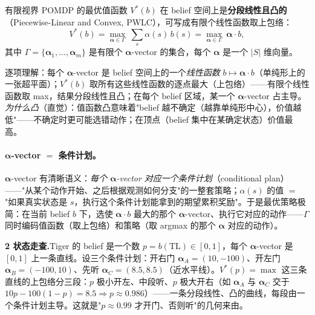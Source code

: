 \begin{theorem}\label{thm:pomdp-pwlc}
有限视界 POMDP 的最优值函数 $V^*(b)$ 在 belief 空间上是\textbf{分段线性且凸的}（Piecewise-Linear and Convex, PWLC），可写成有限个线性函数取上包络：
\begin{equation}
  V^*(b)=\max_{\boldsymbol{\alpha}\in\Gamma}\ \sum_{s}\alpha(s)\,b(s)=\max_{\boldsymbol{\alpha}\in\Gamma}\ \boldsymbol{\alpha}\cdot b,
  \label{eq:pomdp-alpha}
\end{equation}
其中 $\Gamma=\{\boldsymbol{\alpha}_1,\dots,\boldsymbol{\alpha}_m\}$ 是有限个 $\boldsymbol{\alpha}$-vector 的集合，每个 $\boldsymbol{\alpha}$ 是一个 $|S|$ 维向量。
\end{theorem}

逐项理解：每个 $\boldsymbol{\alpha}$-vector 是 belief 空间上的一个\emph{线性函数} $b\mapsto\boldsymbol{\alpha}\cdot b$（单纯形上的一张超平面）；$V^*(b)$ 取所有这些线性函数的逐点最大（上包络）——有限个线性函数取 max，结果分段线性且凸；在每个 belief 区域，某一个 $\boldsymbol{\alpha}$-vector 占主导。\emph{为什么凸}（直觉）：值函数凸意味着"belief 越不确定（越靠单纯形中心），价值越低"——不确定时更可能选错动作；在顶点（belief 集中在某确定状态）价值最高。

\paragraph{$\boldsymbol{\alpha}$-vector $=$ 条件计划。}
$\boldsymbol{\alpha}$-vector 有清晰语义：\emph{每个 $\boldsymbol{\alpha}$-vector 对应一个条件计划}（conditional plan）——"从某个动作开始、之后根据观测如何分支"的一整套策略；$\alpha(s)$ 的值 $=$ "如果真实状态是 $s$，执行这个条件计划能拿到的期望累积奖励"。于是最优策略极简：在当前 belief $b$ 下，选使 $\boldsymbol{\alpha}\cdot b$ 最大的那个 $\boldsymbol{\alpha}$-vector、执行它对应的动作——$\Gamma$ 同时编码值函数（取上包络）和策略（取 argmax 的那个 $\boldsymbol{\alpha}$ 对应的动作）。

\begin{note}
\textbf{2 状态走查.}\;Tiger 的 belief 是一个数 $p=b(\text{TL})\in[0,1]$，每个 $\boldsymbol{\alpha}$-vector 是 $[0,1]$ 上一条直线。设三个条件计划：开右门 $\boldsymbol{\alpha}_A=(10,-100)$、开左门 $\boldsymbol{\alpha}_B=(-100,10)$、先听 $\boldsymbol{\alpha}_C=(8.5,8.5)$（近水平线）。$V^*(p)=\max$ 这三条直线的上包络分三段：$p$ 极小开左、中段听、$p$ 极大开右（如 $\boldsymbol{\alpha}_A$ 与 $\boldsymbol{\alpha}_C$ 交于 $10p-100(1-p)=8.5\Rightarrow p\approx0.986$）——一条分段线性、凸的曲线，每段由一个条件计划主导。这就是"$p\approx0.99$ 才开门、否则听"的几何来由。
\end{note}

